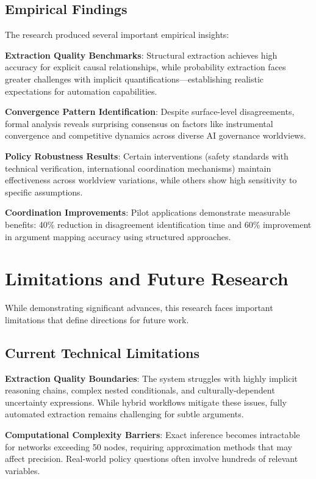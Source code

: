 \documentclass[
  11pt,
  letterpaper,
]{book}
\begin{document}
\subsection{Empirical Findings}\label{sec-empirical-findings}

The research produced several important empirical insights:

\textbf{Extraction Quality Benchmarks}: Structural extraction achieves
high accuracy for explicit causal relationships, while probability
extraction faces greater challenges with implicit
quantifications---establishing realistic expectations for automation
capabilities.

\textbf{Convergence Pattern Identification}: Despite surface-level
disagreements, formal analysis reveals surprising consensus on factors
like instrumental convergence and competitive dynamics across diverse AI
governance worldviews.

\textbf{Policy Robustness Results}: Certain interventions (safety
standards with technical verification, international coordination
mechanisms) maintain effectiveness across worldview variations, while
others show high sensitivity to specific assumptions.

\textbf{Coordination Improvements}: Pilot applications demonstrate
measurable benefits: 40\% reduction in disagreement identification time
and 60\% improvement in argument mapping accuracy using structured
approaches.

\section{Limitations and Future Research}\label{sec-future-research}

While demonstrating significant advances, this research faces important
limitations that define directions for future work.

\subsection{Current Technical
Limitations}\label{sec-current-limitations}

\textbf{Extraction Quality Boundaries}: The system struggles with highly
implicit reasoning chains, complex nested conditionals, and
culturally-dependent uncertainty expressions. While hybrid workflows
mitigate these issues, fully automated extraction remains challenging
for subtle arguments.

\textbf{Computational Complexity Barriers}: Exact inference becomes
intractable for networks exceeding 50 nodes, requiring approximation
methods that may affect precision. Real-world policy questions often
involve hundreds of relevant variables.
\end{document}
